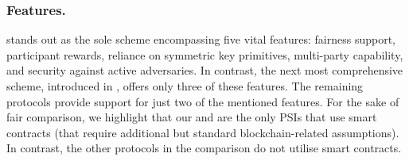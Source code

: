 \vspace{-4.8mm}
\subsubsection{Features.} \epsi stands out as the sole scheme encompassing five vital features: fairness support, participant rewards, reliance on symmetric key primitives, multi-party capability, and security against active adversaries.  In contrast, the next most comprehensive scheme, introduced in \cite{NevoTY21}, offers only three of these features. The remaining protocols provide support for just two of the mentioned features. For the sake of fair comparison, we highlight that our \epsi and  \fpsi are the only PSIs that use smart contracts (that require additional but standard blockchain-related assumptions). In contrast, the other protocols in the comparison do not utilise smart contracts. 








